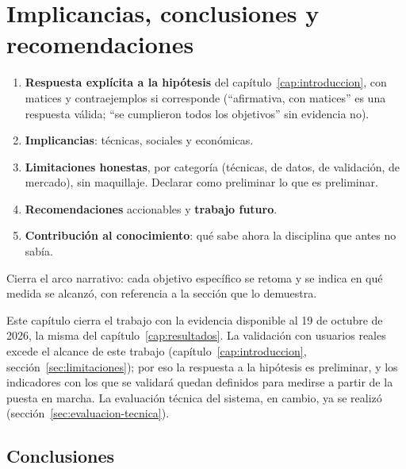 
\chapter{Implicancias, conclusiones y recomendaciones}\label{cap:conclusiones}

\begin{guia}
\begin{enumerate}
    \item \textbf{Respuesta explícita a la hipótesis} del
          capítulo~\ref{cap:introduccion}, con matices y contraejemplos
          si corresponde (``afirmativa, con matices'' es una respuesta
          válida; ``se cumplieron todos los objetivos'' sin evidencia no).
    \item \textbf{Implicancias}: técnicas, sociales y económicas.
    \item \textbf{Limitaciones honestas}, por categoría (técnicas, de datos,
          de validación, de mercado), sin maquillaje. Declarar como
          preliminar lo que es preliminar.
    \item \textbf{Recomendaciones} accionables y \textbf{trabajo futuro}.
    \item \textbf{Contribución al conocimiento}: qué sabe ahora la disciplina
          que antes no sabía.
\end{enumerate}
Cierra el arco narrativo: cada objetivo específico se retoma y se
indica en qué medida se alcanzó, con referencia a la sección que lo
demuestra.
\end{guia}

Este capítulo cierra el trabajo con la evidencia disponible al 19 de
octubre de 2026, la misma del capítulo~\ref{cap:resultados}. La
validación con usuarios reales excede el alcance de este trabajo
(capítulo~\ref{cap:introduccion}, sección~\ref{sec:limitaciones}); por
eso la respuesta a la hipótesis es preliminar, y los indicadores con los
que se validará quedan definidos para medirse a partir de la puesta en
marcha. La evaluación técnica del sistema, en cambio, ya se realizó
(sección~\ref{sec:evaluacion-tecnica}).

\section{Conclusiones}\label{sec:conclusiones}

